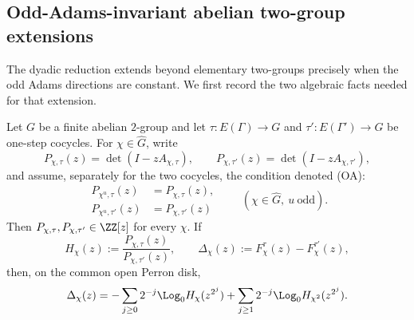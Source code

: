 \subsection{Odd-Adams-invariant abelian two-group extensions}
\label{sec:odd-adams-sampling}

The dyadic reduction extends beyond elementary two-groups precisely when the
odd Adams directions are constant.  We first record the two algebraic facts
needed for that extension.

\begin{lemma}
\label{lem:odd-adams-mobius-collapse}
Let \(G\) be a finite abelian \(2\)-group and let
\(\tau:E(\Gamma)\to G\) and \(\tau':E(\Gamma')\to G\) be one-step
cocycles.  For \(\chi\in\widehat G\), write
\[
 P_{\chi,\tau}(z)=\det(I-zA_{\chi,\tau}),\qquad
 P_{\chi,\tau'}(z)=\det(I-zA_{\chi,\tau'}),
\]
and assume, separately for the two cocycles, the condition denoted (OA):
\begin{equation}\label{eq:odd-adams-determinant-invariance}
 \begin{aligned}
 P_{\chi^u,\tau}(z)&=P_{\chi,\tau}(z),\\
 P_{\chi^u,\tau'}(z)&=P_{\chi,\tau'}(z)
 \end{aligned}
 \qquad(\chi\in\widehat G,\ u\ \text{odd}).
\end{equation}
Then \(P_{\chi,\tau},P_{\chi,\tau'}\in\ZZ[z]\) for every \(\chi\).
If
\[
 H_\chi(z):=\frac{P_{\chi,\tau}(z)}{P_{\chi,\tau'}(z)},\qquad
 \Delta_\chi(z):=F_\chi^\tau(z)-F_\chi^{\tau'}(z),
\]
then, on the common open Perron disk,
\begin{equation}\label{eq:odd-adams-mobius-collapse}
 \Delta_\chi(z)
 =-\sum_{j\ge0}2^{-j}\Log_0H_\chi(z^{2^j})
  +\sum_{j\ge1}2^{-j}\Log_0H_{\chi^2}(z^{2^j}).
\end{equation}
\end{lemma}

